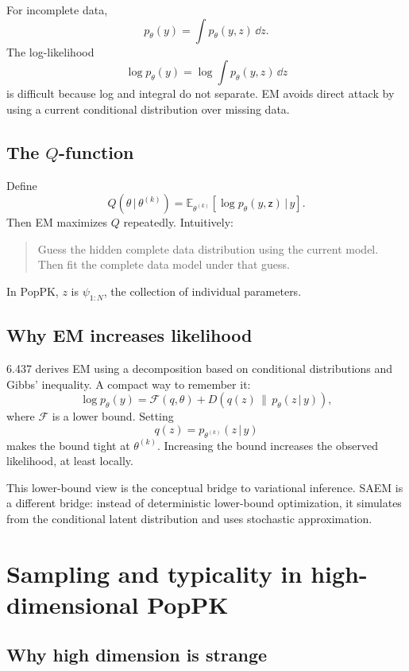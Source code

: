 \documentclass[a4paper]{article}
\newcommand{\rv}[1]{\mathsf{#1}}
\newcommand{\given}{\,|\,}
\newcommand{\E}{\mathbb{E}}
\begin{document}
For incomplete data,
\[
  p_\theta(y)=\int p_\theta(y,z)\,\dd z.
\]
The log-likelihood
\[
  \log p_\theta(y)=\log\int p_\theta(y,z)\,\dd z
\]
is difficult because log and integral do not separate. EM avoids direct attack by using a current conditional distribution over missing data.

\subsection{The \(Q\)-function}

Define
\[
  Q(\theta\given\theta^{(k)})
  =
  \E_{\theta^{(k)}}[
    \log p_\theta(y,\rv{z})
    \given y
  ].
\]
Then EM maximizes \(Q\) repeatedly. Intuitively:

\begin{quote}
  Guess the hidden complete data distribution using the current model.
  Then fit the complete data model under that guess.
\end{quote}

In PopPK, \(z\) is \(\psi_{1:N}\), the collection of individual parameters.

\subsection{Why EM increases likelihood}

6.437 derives EM using a decomposition based on conditional distributions and Gibbs' inequality. A compact way to remember it:
\[
  \log p_\theta(y)
  =
  \mathcal{F}(q,\theta)
  +
  D\!\left(q(z)\,\|\,p_\theta(z\given y)\right),
\]
where \(\mathcal{F}\) is a lower bound. Setting
\[
  q(z)=p_{\theta^{(k)}}(z\given y)
\]
makes the bound tight at \(\theta^{(k)}\). Increasing the bound increases the observed likelihood, at least locally.

\begin{remark}
  This lower-bound view is the conceptual bridge to variational inference. SAEM is a different bridge: instead of deterministic lower-bound optimization, it simulates from the conditional latent distribution and uses stochastic approximation.
\end{remark}

\section{Sampling and typicality in high-dimensional PopPK}

\subsection{Why high dimension is strange}
\end{document}
